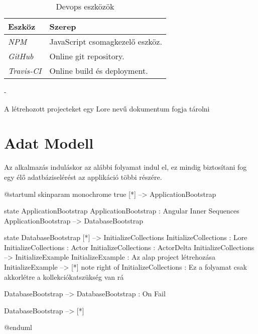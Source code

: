 \begin{table}[H]
	\centering
	\begin{tabular}{ | m{} | m{} | }
		\hline
		\textbf{Eszköz} & \textbf{Szerep} \\
		\hline \hline
		\emph{NPM} \cite{NPM} & JavaScript csomagkezelő eszköz.  \\
		\hline
		\emph{GitHub} \cite{Github} & Online git repository.  \\
		\hline
		\emph{Travis-CI} \cite{Travis} & Online build és deployment.  \\
		\hline
	\end{tabular}
	\caption{Devops eszközök}
	\label{tab:technologies}
\end{table}


-






A létrehozott projecteket egy Lore nevű dokumentum fogja tárolni




\section{Adat Modell}










Az alkalmazás induláskor az alábbi folyamat indul el, ez mindig biztosítani fog egy élő adatbáziselérést az applikáció többi részére.

\begin{plantuml}
	@startuml
	skinparam monochrome true
	[*] --> ApplicationBootstrap

	state ApplicationBootstrap {
		ApplicationBootstrap : Angular Inner Sequences
	}
	ApplicationBootstrap --> DatabaseBootstrap

	state DatabaseBootstrap {
		[*] --> InitializeCollections
		InitializeCollections : Lore
		InitializeCollections : Actor
		InitializeCollections : ActorDelta
		InitializeCollections --> InitializeExample
		InitializeExample : Az alap project létrehozása
		InitializeExample --> [*]
		note right of InitializeCollections : Ez a folyamat csak akkor\nhozza létre a kollekciókat\nha szükség van rá
	}

	DatabaseBootstrap --> DatabaseBootstrap : On Fail

	DatabaseBootstrap --> [*]

	@enduml
\end{plantuml}



